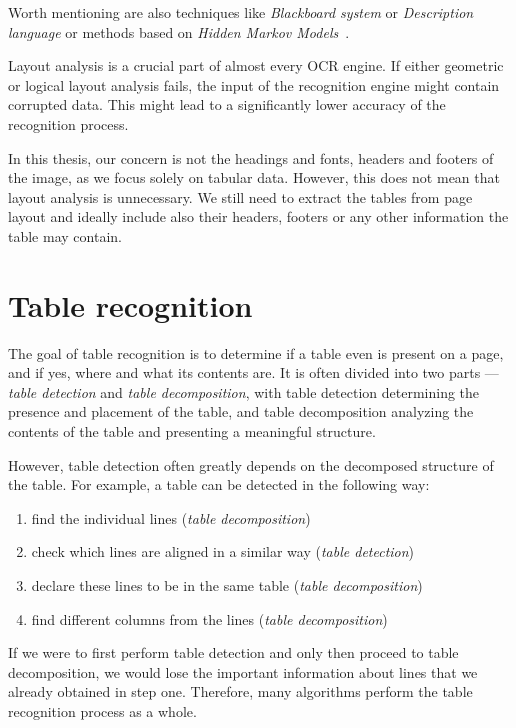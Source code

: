 Worth mentioning are also techniques like \emph{Blackboard system} or \emph{Description language} or methods based on \emph{Hidden Markov Models}~\cite{logicalLayoutOther}.

Layout analysis is a crucial part of almost every OCR engine. If either geometric or logical layout analysis fails, the input of the recognition engine might contain corrupted data. This might lead to a significantly lower accuracy of the recognition process. 

In this thesis, our concern is not the headings and fonts, headers and footers of the image, as we focus solely on tabular data. However, this does not mean that layout analysis is unnecessary. We still need to extract the tables from page layout and ideally include also their headers, footers or any other information the table may contain.

\section{Table recognition}

The goal of table recognition is to determine if a table even is present on a page, and if yes, where and what its contents are. It is often divided into two parts --- \emph{table detection} and \emph{table decomposition}, with table detection determining the presence and placement of the table, and table decomposition analyzing the contents of the table and presenting a meaningful structure.

However, table detection often greatly depends on the decomposed structure of the table. For example, a table can be detected in the following way:

\begin{enumerate}
    \item find the individual lines (\emph{table decomposition})
    \item check which lines are aligned in a similar way (\emph{table detection})
    \item declare these lines to be in the same table (\emph{table decomposition})
    \item find different columns from the lines (\emph{table decomposition})
\end{enumerate}

If we were to first perform table detection and only then proceed to table decomposition, we would lose the important information about lines that we already obtained in step one. Therefore, many algorithms perform the table recognition process as a whole.

